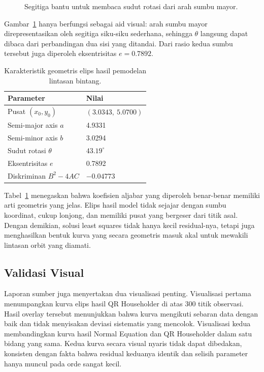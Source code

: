 \documentclass[12pt,a4paper]{article}
\begin{document}
\begin{figure}[h]
\centering
{}
\caption{Segitiga bantu untuk membaca sudut rotasi dari arah sumbu mayor.}
\label{fig:rotation-angle}
\end{figure}

Gambar~\ref{fig:rotation-angle} hanya berfungsi sebagai aid visual: arah sumbu mayor direpresentasikan oleh segitiga siku-siku sederhana, sehingga \(\theta\) langsung dapat dibaca dari perbandingan dua sisi yang ditandai. Dari rasio kedua sumbu tersebut juga diperoleh eksentrisitas \(e=0.7892\).

\begin{table}[h]
\centering
\caption{Karakteristik geometris elips hasil pemodelan lintasan bintang.}
\label{tab:star-geometry}
\begin{tabular}{ll}
\toprule
Parameter & Nilai \\
\midrule
Pusat $(x_0,y_0)$ & $(3.0343,\ 5.0700)$ \\
Semi-major axis $a$ & 4.9331 \\
Semi-minor axis $b$ & 3.0294 \\
Sudut rotasi $\theta$ & $43.19^\circ$ \\
Eksentrisitas $e$ & 0.7892 \\
Diskriminan $B^2-4AC$ & $-0.04773$ \\
\bottomrule
\end{tabular}
\end{table}

Tabel~\ref{tab:star-geometry} menegaskan bahwa koefisien aljabar yang diperoleh benar-benar memiliki arti geometris yang jelas. Elips hasil model tidak sejajar dengan sumbu koordinat, cukup lonjong, dan memiliki pusat yang bergeser dari titik asal. Dengan demikian, solusi least squares tidak hanya kecil residual-nya, tetapi juga menghasilkan bentuk kurva yang secara geometris masuk akal untuk mewakili lintasan orbit yang diamati.

\subsection{Validasi Visual}
Laporan sumber juga menyertakan dua visualisasi penting. Visualisasi pertama menumpangkan kurva elips hasil QR Householder di atas 300 titik observasi. Hasil overlay tersebut menunjukkan bahwa kurva mengikuti sebaran data dengan baik dan tidak menyisakan deviasi sistematis yang mencolok. Visualisasi kedua membandingkan kurva hasil Normal Equation dan QR Householder dalam satu bidang yang sama. Kedua kurva secara visual nyaris tidak dapat dibedakan, konsisten dengan fakta bahwa residual keduanya identik dan selisih parameter hanya muncul pada orde sangat kecil.
\end{document}
